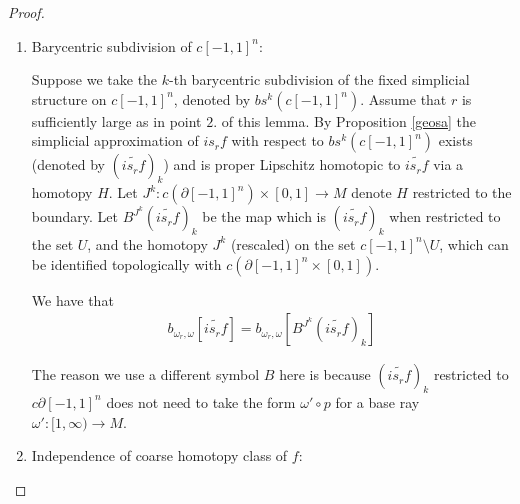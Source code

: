 \documentclass[a4paper,11pt]{article}
\theoremstyle{definition}
\theoremstyle{plain}
\theoremstyle{remark}
\begin{document}
{\begin{proof}
\begin{enumerate}
As before, there exists a $S>0$ such that $G(|st(v)|)$ has diameter $<S$ for all vertices $v\in c[0,1]^{n+1}$, and a $r$ large enough so that $i s_{r} G$ has a simplicial approximation $\widetilde{is_{r}G}$. Observe that $\widetilde{is_{r}G}_{|c([0,1]^n \times \{0\})}$ and $\widetilde{is_{r}G}_{|c([0,1]^n \times \{1\})}$ are simplicial approximations of $i s_{r}  f$ and $i  s_{r} s_{1} f = i s_{r+1} f$ respectively (since for a vertex, the star considered in the subcomplex $c([0,1]^n \times \partial[0,1])$ is contained within the star considered in $c[0,1]^{n+1}$. After changing base rays with the same argument as point $1$ of this lemma, $b_{\omega_{r},\omega}[\widetilde{is_{r}f}] = b_{\omega_{r+1},\omega}[\widetilde{is_{r+1}f}] \in \pi_{n}^{L,e}(M,\omega)$. By replacing $r$ by $r+1$, we can inductively show that  $b_{\omega_{r'},\omega}[\widetilde{is_{r'}f}] = b_{\omega_{r},\omega} [\widetilde{is_{r}f}]$ for all $r'\geq r$. 

\item Barycentric subdivision of $c[-1,1]^n$:

Suppose we take the $k$-th barycentric subdivision of the fixed simplicial structure on $c[-1,1]^n$, denoted by $bs^k(c[-1,1]^n)$. Assume that $r$ is sufficiently large as in point $2.$ of this lemma. By Proposition \ref{geosa} the simplicial approximation of $is_{r}f$ with respect to $bs^k(c[-1,1]^n)$ exists (denoted by $(\widetilde{is_{r}f})_{k}$) and is proper Lipschitz homotopic to $\widetilde{is_{r}f}$ via a homotopy $H$. Let $J^{k}: c(\partial[-1,1]^n) \times [0,1]\rightarrow M$ denote $H$ restricted to the boundary. Let $B^{J^{k}}(\widetilde{is_{r}f})_{k}$ be the map which is $(\widetilde{is_{r}f})_{k}$ when restricted to the set $U$, and the homotopy $J^{k}$ (rescaled) on the set $c[-1,1]^n \setminus U$, which can be identified topologically with $c(\partial[-1,1]^n \times [0,1])$. 

We have that
\begin{align*}
b_{\omega_r,\omega}[\widetilde{is_{r}f}] = b_{\omega_r,\omega}[B^{J^{k}}(\widetilde{is_{r}f})_{k}] 
\end{align*}

The reason we use a different symbol $B$ here is because $(\widetilde{is_{r}f})_{k}$ restricted to $c \partial [-1,1]^n$ does not need to take the form $\omega'\circ p$ for a base ray $\omega': [1,\infty)\rightarrow M$. 

\item Independence of coarse homotopy class of $f$: 


\end{enumerate}
\end{proof}}
\end{document}
